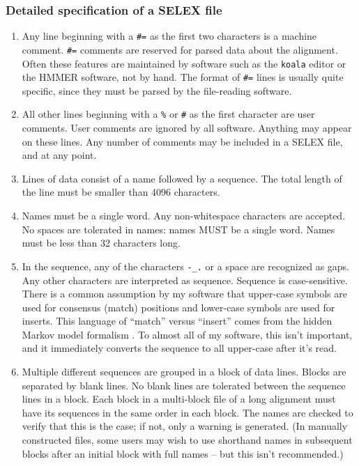 \subsubsection {Detailed specification of a SELEX file}

\begin{enumerate}
\item
Any line beginning with a \verb+#=+ as the first two characters is a
machine comment.  \verb+#=+ comments are reserved for parsed data
about the alignment. Often these features are maintained by software
such as the {\tt koala} editor or the HMMER software, not by hand. The
format of \verb+#=+ lines is usually quite specific, since they must
be parsed by the file-reading software.

\item
All other lines beginning with a \verb+%+ or \verb+#+ as the first
character are user comments.  User comments are ignored by all
software. Anything may appear on these lines. Any number of comments
may be included in a SELEX file, and at any point.

\item
Lines of data consist of a name followed by a sequence. The total
length of the line must be smaller than 4096 characters.

\item
Names must be a single word. Any non-whitespace characters are
accepted.  No spaces are tolerated in names: names MUST be a
single word. Names must be less than 32 characters long.

\item In the sequence, any of the characters \verb+-_.+ or a space are
recognized as gaps. Any other characters are interpreted as sequence.
Sequence is case-sensitive. There is a common assumption by my
software that upper-case symbols are used for consensus (match)
positions and lower-case symbols are used for inserts. This language
of ``match'' versus ``insert'' comes from the hidden Markov model
formalism \cite{Krogh94}. To almost all of my software, this isn't
important, and it immediately converts the sequence to all upper-case
after it's read.

\item
Multiple different sequences are grouped in a block of data lines.
Blocks are separated by blank lines. No blank lines are tolerated
between the sequence lines in a block. Each block in a multi-block
file of a long alignment must have its sequences in the same order in
each block. The names are checked to verify that this is the case; if
not, only a warning is generated. (In manually constructed files, some
users may wish to use shorthand names in subsequent blocks after an
initial block with full names -- but this isn't recommended.)
\end{enumerate}

